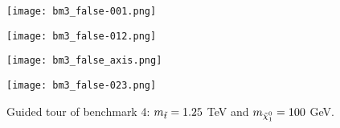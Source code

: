 \begin{figure}[htbp]
\centering
  \begin{minipage}[htbp]{0.49\textwidth}
    \centering
    \texttt{[image: bm3\_false-001.png]}
  \end{minipage}
  \begin{minipage}[htbp]{0.49\textwidth}
    \centering
    \texttt{[image: bm3\_false-012.png]}
  \end{minipage}
  \begin{minipage}[htbp]{0.49\textwidth}
    \centering
    \texttt{[image: bm3\_false\_axis.png]}
  \end{minipage}
  \begin{minipage}[htbp]{0.49\textwidth}
    \centering
    \texttt{[image: bm3\_false-023.png]}
  \end{minipage}
  \caption{Guided tour of benchmark 4: $m_{\Tilde{t}} = 1.25$ TeV and $m_{\Tilde{\chi}_1^0} = 100$ GeV. }
  \label{fig:bm3F_tour}
\end{figure}


